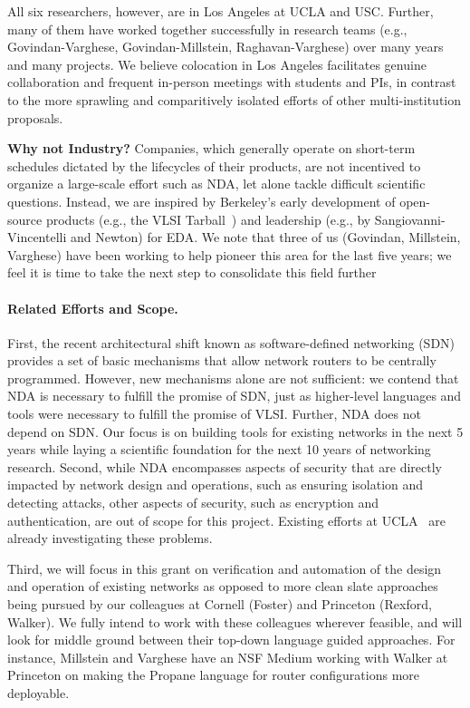 All six researchers, however, are in Los Angeles at UCLA and USC. Further, many of them have worked together successfully in research teams (e.g., Govindan-Varghese, Govindan-Millstein, Raghavan-Varghese) over many years and many projects. We believe colocation in Los Angeles facilitates genuine collaboration and frequent in-person meetings with students and PIs, in contrast to the more sprawling and comparitively isolated efforts of other multi-institution proposals.

{\bf Why not Industry?} Companies, which generally operate on short-term schedules dictated by the lifecycles of their products, are not incentived to organize a large-scale effort such as NDA, let alone tackle difficult scientific questions. Instead, we are inspired by Berkeley's early development of open-source products (e.g., the VLSI Tarball~\cite{wikicite}) and leadership (e.g., by Sangiovanni-Vincentelli and Newton) for EDA.  We note that three of us (Govindan, Millstein, Varghese) have been working to help pioneer this area for the last five years; we feel it is time to take the next step to consolidate this field further

\paragraph*{Related Efforts and Scope.}
%
First, the recent architectural shift known as software-defined networking (SDN) provides a set of basic mechanisms that allow network routers to be centrally programmed.  However, new mechanisms alone are not sufficient: we contend that NDA is necessary to fulfill the promise of SDN, just as higher-level languages and tools were necessary to fulfill the promise of VLSI. Further, NDA does not depend on SDN. Our focus is on building tools for existing networks in the next 5 years while laying a scientific foundation for the next 10 years of networking research. Second, while NDA encompasses aspects of security that are directly impacted by network design and operations, such as ensuring isolation and detecting attacks, other aspects of security, such as encryption and authentication, are out of scope for this project. Existing efforts at  UCLA~\cite{amitcenter} are already investigating these problems.  

Third, we will focus in this grant on verification and automation of the
design and operation of existing networks as opposed to more clean slate
approaches being pursued by our colleagues at Cornell (Foster) and Princeton (Rexford, Walker).  We fully intend to work with these colleagues wherever feasible, and will look for middle ground between their top-down language guided approaches.  For instance, Millstein and Varghese have an NSF Medium working
with Walker at Princeton on making the Propane language for router configurations more deployable.

